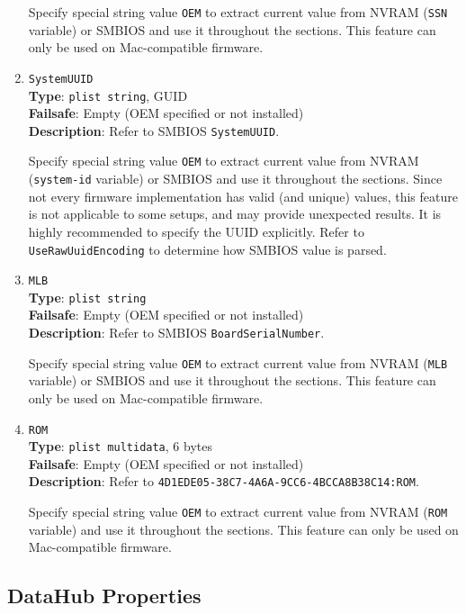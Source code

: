 \documentclass[]{article}
\begin{document}
\begin{enumerate}
  Specify special string value \texttt{OEM} to extract current value from NVRAM
  (\texttt{SSN} variable) or SMBIOS and use it throughout the sections.
  This feature can only be used on Mac-compatible firmware.
\item
  \texttt{SystemUUID}\\
  \textbf{Type}: \texttt{plist\ string}, GUID\\
  \textbf{Failsafe}: Empty (OEM specified or not installed)\\
  \textbf{Description}: Refer to SMBIOS \texttt{SystemUUID}.

  Specify special string value \texttt{OEM} to extract current value from NVRAM
  (\texttt{system-id} variable) or SMBIOS and use it throughout the sections.
  Since not every firmware implementation has valid (and unique) values, this
  feature is not applicable to some setups, and may provide unexpected results.
  It is highly recommended to specify the UUID explicitly. Refer to
  \texttt{UseRawUuidEncoding} to determine how SMBIOS value is parsed.
\item
  \texttt{MLB}\\
  \textbf{Type}: \texttt{plist\ string}\\
  \textbf{Failsafe}: Empty (OEM specified or not installed)\\
  \textbf{Description}: Refer to SMBIOS \texttt{BoardSerialNumber}.

  Specify special string value \texttt{OEM} to extract current value from NVRAM
  (\texttt{MLB} variable) or SMBIOS and use it throughout the sections.
  This feature can only be used on Mac-compatible firmware.
\item
  \texttt{ROM}\\
  \textbf{Type}: \texttt{plist\ multidata}, 6 bytes\\
  \textbf{Failsafe}: Empty (OEM specified or not installed)\\
  \textbf{Description}: Refer to
  \texttt{4D1EDE05-38C7-4A6A-9CC6-4BCCA8B38C14:ROM}.

  Specify special string value \texttt{OEM} to extract current value from NVRAM
  (\texttt{ROM} variable) and use it throughout the sections.
  This feature can only be used on Mac-compatible firmware.

\end{enumerate}

\subsection{DataHub Properties}\label{platforminfodatahub}
\end{document}
